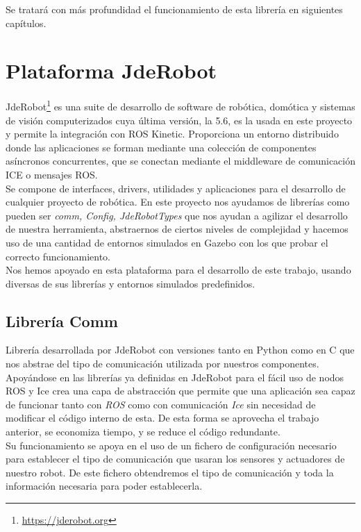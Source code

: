 Se tratará con más profundidad el funcionamiento de esta librería en siguientes capítulos.




\section{Plataforma JdeRobot}
\label{sec:jderobot}
JdeRobot\footnote{\url{https://jderobot.org}} es una suite de desarrollo de software de robótica, domótica y sistemas de
visión computerizados cuya última versión, la 5.6, es la usada en este proyecto y permite la integración con ROS Kinetic. Proporciona un entorno distribuido donde las aplicaciones se forman mediante una colección de componentes asíncronos concurrentes, que se conectan mediante el middleware de comunicación ICE o mensajes ROS.\\

Se compone de interfaces, drivers, utilidades y aplicaciones para el desarrollo de cualquier proyecto de robótica. En este proyecto nos ayudamos de librerías como pueden ser \textit{comm, Config, JdeRobotTypes} que nos ayudan a agilizar el desarrollo de nuestra herramienta, abstraernos de ciertos niveles de complejidad y hacemos uso de una cantidad de entornos simulados en Gazebo con los que probar el correcto funcionamiento.\\

Nos hemos apoyado en esta plataforma para el desarrollo de este trabajo, usando diversas de sus librerías y entornos simulados predefinidos.


\subsection{Librería Comm}
\label{sec:libreria-com}
Librería desarrollada por JdeRobot con versiones tanto en Python como en C que nos abstrae del tipo de comunicación utilizada por nuestros componentes. Apoyándose en las librerías ya definidas en JdeRobot para el fácil uso de nodos ROS y Ice crea una capa de abstracción que permite que una aplicación sea capaz de funcionar tanto con \textit{ROS} como con comunicación \textit{Ice} sin necesidad de modificar el código interno de esta. De esta forma se aprovecha el trabajo anterior, se economiza tiempo, y se reduce el código redundante.\\

Su funcionamiento se apoya en el uso de un fichero de configuración necesario para establecer el tipo de comunicación que usaran los sensores y actuadores de nuestro robot. De este fichero obtendremos el tipo de comunicación y toda la información necesaria para poder establecerla. \\

